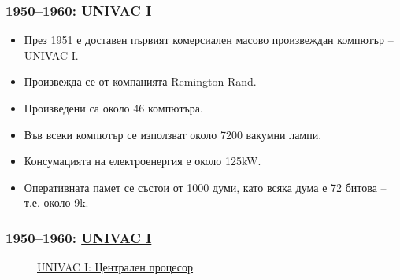 \documentclass[ignorenonframetext, hyperref=unicode]{beamer}
\begin{document}
\begin{frame}
\frametitle{1950--1960: \href{http://en.wikipedia.org/wiki/UNIVAC_I}{UNIVAC I}}
\begin{itemize}
  \item През 1951 е доставен първият комерсиален масово произвеждан компютър --
  UNIVAC I.
  \item Произвежда се от компанията Remington Rand.
  \item Произведени са около 46 компютъра.
  \item Във всеки компютър се използват около 7200 вакумни лампи.
  \item Консумацията на електроенергия е около 125kW.
  \item Оперативната памет се състои от 1000 думи, като всяка дума е 72 битова --
  т.е. около 9k.
\end{itemize}
\end{frame}

\begin{frame}
\frametitle{1950--1960: \href{http://en.wikipedia.org/wiki/UNIVAC_I}{UNIVAC I}}
\begin{figure}[h]
\center
{}
\caption{\href{http://en.wikipedia.org/wiki/Image:UNIVAC-I.JPG}{UNIVAC I:
Централен процесор}}
\end{figure}
\end{frame}
\end{document}
